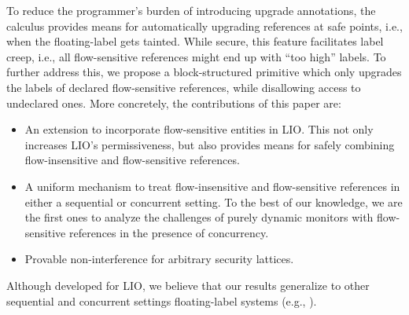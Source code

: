 To reduce the programmer's burden of
introducing upgrade annotations, the calculus provides means for automatically
upgrading references at safe points, i.e., when the floating-label gets tainted.
While secure, this feature facilitates label creep, i.e., all flow-sensitive
references might end up with ``too high'' labels. To further address this, we propose a
block-structured primitive which only upgrades the labels of declared
flow-sensitive references, while disallowing access to undeclared ones.
More concretely, the contributions of this paper are:
\begin{itemize}

\item An extension to incorporate flow-sensitive entities in LIO. This
  not only increases LIO's permissiveness, but also provides means for safely
  combining flow-insensitive and flow-sensitive references.

\item A uniform mechanism to treat flow-insensitive and flow-sensitive
  references in either a sequential or concurrent setting. To the best of our
  knowledge, we are the first ones to analyze the challenges of purely dynamic
  monitors with flow-sensitive references in the presence of concurrency.

\item Provable non-interference for arbitrary security lattices.

\end{itemize}
%
Although developed for LIO, we believe that our results generalize to other
sequential and concurrent settings floating-label systems (e.g.,
\cite{10.1109/SP.2013.10, Efstathopoulos:2005, zeldovich:histar, krohn:flume}).


